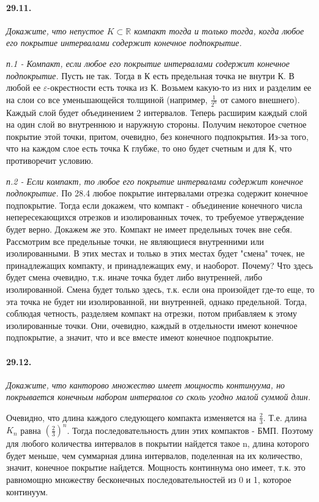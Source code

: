 \documentclass{book}
\begin{document}
\paragraph{29.11.}
\textit{Докажите, что непустое $K \subset \mathbb{R}$ компакт
тогда и только тогда, когда любое его покрытие интервалами содержит конечное подпокрытие.}

\textit{п.1 - Компакт, если любое его покрытие интервалами содержит конечное подпокрытие.} Пусть не так. Тогда в К есть предельная точка не внутри К. В любой ее $\varepsilon$-окрестности есть точка из К. Возьмем какую-то из них и разделим ее на слои со все уменьшающейся толщиной (например, $\frac{1}{2^n}$ от самого внешнего). Каждый слой будет объединением 2 интервалов. Теперь расширим каждый слой на один слой во внутреннюю и наружную стороны. Получим некоторое счетное покрытие этой точки, притом, очевидно, без конечного подпокрытия. Из-за того, что на каждом слое есть точка К глубже, то оно будет счетным и для К, что противоречит условию.

\textit{п.2 - Если компакт, то любое его покрытие интервалами содержит конечное подпокрытие.} По 28.4 любое покрытие интервалами отрезка содержит конечное подпокрытие. Тогда если докажем, что компакт - объединение конечного числа непересекающихся отрезков и изолированных точек, то требуемое утверждение будет верно. Докажем же это. Компакт не имеет предельных точек вне себя. Рассмотрим все предельные точки, не являющиеся внутренними или изолированными. В этих местах и только в этих местах будет "смена" \text{} точек, не принадлежащих компакту, и принадлежащих ему, и наоборот. Почему? Что здесь будет смена очевидно, т.к. иначе точка будет либо внутренней, либо изолированной. Смена будет только здесь, т.к. если она произойдет где-то еще, то эта точка не будет ни изолированной, ни внутренней, однако предельной. Тогда, соблюдая четность, разделяем компакт на отрезки, потом прибавляем к этому изолированные точки. Они, очевидно, каждый в отдельности имеют конечное подпокрытие, а значит, что и все вместе имеют конечное подпокрытие.

\paragraph{29.12.}
\textit{Докажите, что канторово множество имеет мощность континуума, но покрывается конечным набором интервалов со сколь угодно малой суммой длин.}

Очевидно, что длина каждого следующего компакта изменяется на $\frac{2}{3}$. Т.е. длина $K_n$ равна $(\frac{2}{3})^n$. Тогда последовательность длин этих компактов - БМП. Поэтому для любого количества интервалов в покрытии найдется такое n, длина которого будет меньше, чем суммарная длина интервалов, поделенная на их количество, значит, конечное покрытие найдется. Мощность континнума оно имеет, т.к. это равномощно множеству бесконечных последовательностей из 0 и 1, которое континуум.
\end{document}
